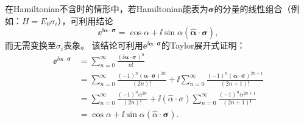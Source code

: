 在Hamiltonian不含时的情形中，若Hamiltonian能表为$\bm{\sigma}$的分量的线性组合（例如：$H=E_0\sigma_i$），可利用结论
\begin{equation}
    \label{eq:spin_exp_pauli}
    \ee^{\ii \bm{\alpha}\cdot\bm{\sigma}} = \cos\alpha + \ii \sin\alpha (\hat{\bm{\alpha}}\cdot\bm{\sigma}),
\end{equation}
而无需变换至$\sigma_i$表象。
该结论可利用$\ee^{\ii \bm{\alpha}\cdot\bm{\sigma}}$的Taylor展开式证明：
\begin{equation}
\begin{aligned}
    \ee^{\ii \bm{\alpha}\cdot\bm{\sigma}}
    &= \sum_{n=0}^\infty \frac{(\ii \bm{\alpha}\cdot\bm{\sigma})^n}{n!}\\
    &= \sum_{n=0}^\infty \frac{(-1)^n (\bm{\alpha}\cdot\bm{\sigma})^{2n}}{(2n)!} + \ii \sum_{n=0}^\infty \frac{(-1)^n (\bm{\alpha}\cdot\bm{\sigma})^{2n+1}}{(2n+1)!}\\
    &= \sum_{n=0}^\infty \frac{(-1)^n \alpha^{2n}}{(2n)!} + \ii (\hat{\alpha}\cdot\sigma) \sum_{n=0}^\infty \frac{(-1)^n \alpha^{2n+1}}{(2n+1)!}\\
    &= \cos\alpha + \ii \sin\alpha (\hat{\alpha}\cdot\bm{\sigma}).
\end{aligned}
\end{equation}

